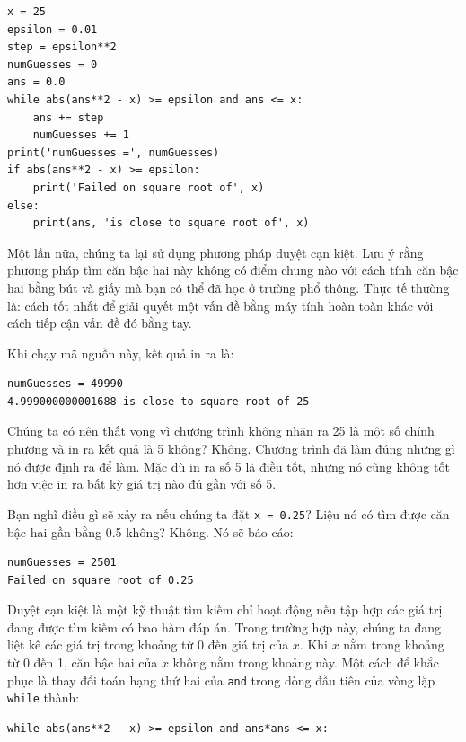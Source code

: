 \begin{tcolorbox}[title=Hình 3.3: Xấp xỉ căn bậc hai bằng phương pháp duyệt cạn kiệt]

\begin{verbatim}
x = 25
epsilon = 0.01
step = epsilon**2
numGuesses = 0
ans = 0.0
while abs(ans**2 - x) >= epsilon and ans <= x:
    ans += step
    numGuesses += 1
print('numGuesses =', numGuesses)
if abs(ans**2 - x) >= epsilon:
    print('Failed on square root of', x)
else:
    print(ans, 'is close to square root of', x)
\end{verbatim}

\end{tcolorbox}

Một lần nữa, chúng ta lại sử dụng phương pháp duyệt cạn kiệt. Lưu ý rằng phương pháp tìm căn bậc hai này không có điểm chung nào với cách tính căn bậc hai bằng bút và giấy mà bạn có thể đã học ở trường phổ thông. Thực tế thường là: cách tốt nhất để giải quyết một vấn đề bằng máy tính hoàn toàn khác với cách tiếp cận vấn đề đó bằng tay.

Khi chạy mã nguồn này, kết quả in ra là:

\begin{verbatim}
numGuesses = 49990
4.999000000001688 is close to square root of 25
\end{verbatim}

Chúng ta có nên thất vọng vì chương trình không nhận ra 25 là một số chính phương và in ra kết quả là 5 không? Không. Chương trình đã làm đúng những gì nó được định ra để làm. Mặc dù in ra số 5 là điều tốt, nhưng nó cũng không tốt hơn việc in ra bất kỳ giá trị nào đủ gần với số 5.

Bạn nghĩ điều gì sẽ xảy ra nếu chúng ta đặt \texttt{x = 0.25}? Liệu nó có tìm được căn bậc hai gần bằng 0.5 không? Không. Nó sẽ báo cáo:

\begin{verbatim}
numGuesses = 2501
Failed on square root of 0.25
\end{verbatim}

Duyệt cạn kiệt là một kỹ thuật tìm kiếm chỉ hoạt động nếu tập hợp các giá trị đang được tìm kiếm có bao hàm đáp án. Trong trường hợp này, chúng ta đang liệt kê các giá trị trong khoảng từ 0 đến giá trị của $x$. Khi $x$ nằm trong khoảng từ 0 đến 1, căn bậc hai của $x$ không nằm trong khoảng này. Một cách để khắc phục là thay đổi toán hạng thứ hai của \texttt{and} trong dòng đầu tiên của vòng lặp \texttt{while} thành:

\begin{verbatim}
while abs(ans**2 - x) >= epsilon and ans*ans <= x:
\end{verbatim}

